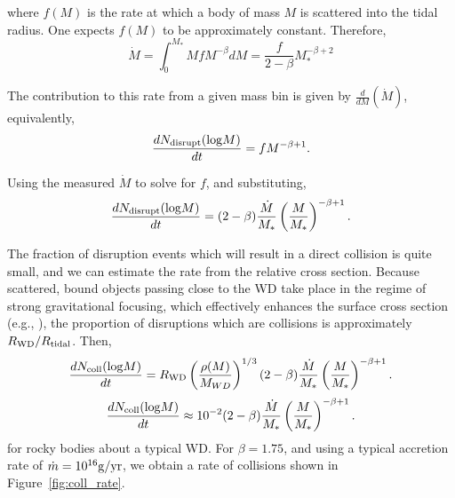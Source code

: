 where $f(M)$ is the rate at which a body of mass $M$ is scattered into the tidal radius.  One expects $f(M)$ to be approximately constant.  Therefore,
\begin{equation}
\dot{M} = \int_0^{M_*} M f M^{-\beta} dM  = \frac{f}{2-\beta} M_*^{-\beta+2}
\end{equation}


The contribution to this rate from a given mass bin is given by $\frac{d}{dM}(\dot{M})$, equivalently, 
\begin{equation}
\frac{dN_{\rm disrupt}({\rm log}M)}{dt} = f M^{-\beta+1}.  
\end{equation}


Using the measured $\dot{M}$ to solve for $f$, and substituting, 
\begin{equation}
\frac{dN_{\rm disrupt}({\rm log}M)}{dt} = (2-\beta) \frac{\dot{M}}{M_*} \left(\frac{M}{M_*}\right)^{-\beta+1}.
\end{equation}


The fraction of disruption events which will result in a direct collision is quite small, and we can estimate the rate from the relative cross section.  Because scattered, bound objects passing close to the WD take place in the regime of strong gravitational focusing, which effectively enhances the surface cross section (e.g., \citealt{Pineault_Landry_1994}), the proportion of disruptions which are collisions is approximately $R_{\rm WD}/R_{\rm tidal}$. Then,
\begin{equation}
\frac{dN_{\rm coll}({\rm log}M)}{dt} = R_{\rm WD} \left(\frac{\rho(M)}{M_{WD}}\right)^{1/3} (2-\beta)\frac{\dot{M}}{M_*} \left(\frac{M}{M_*}\right)^{-\beta+1}.
\end{equation}
\begin{equation}
\frac{dN_{\rm coll}({\rm log}M)}{dt} \approx 10^{-2} (2-\beta)\frac{\dot{M}}{M_*} \left(\frac{M}{M_*}\right)^{-\beta+1}.
\end{equation}
for rocky bodies about a typical WD.  For $\beta = 1.75$, and using a typical accretion rate of $\dot{m} = 10^{16}{\rm g/yr}$, we obtain a rate of collisions shown in Figure~\ref{fig:coll_rate}.
